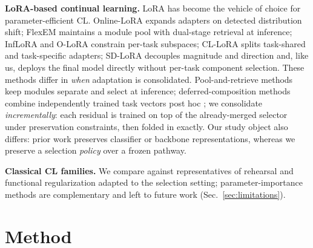 \documentclass{article}
\begin{document}
\textbf{LoRA-based continual learning.} LoRA \cite{hu2022lora} has become the vehicle of choice for parameter-efficient CL. Online-LoRA \cite{wei2025onlinelora} expands adapters on detected distribution shift; FlexEM \cite{chen2026flexem} maintains a module pool with dual-stage retrieval at inference; InfLoRA \cite{liang2024inflora} and O-LoRA \cite{wang2023olora} constrain per-task subspaces; CL-LoRA \cite{he2025cllora} splits task-shared and task-specific adapters; SD-LoRA \cite{wu2025sdlora} decouples magnitude and direction and, like us, deploys the final model directly without per-task component selection. These methods differ in \emph{when} adaptation is consolidated. Pool-and-retrieve methods keep modules separate and select at inference; deferred-composition methods combine independently trained task vectors post hoc \cite{ilharco2023task,yadav2023ties,marczak2024magmax}; we consolidate \emph{incrementally}: each residual is trained on top of the already-merged selector under preservation constraints, then folded in exactly. Our study object also differs: prior work preserves classifier or backbone representations, whereas we preserve a selection \emph{policy} over a frozen pathway.

\textbf{Classical CL families.} We compare against representatives of rehearsal \cite{lopezpaz2017gem,buzzega2020derpp,rebuffi2017icarl} and functional regularization \cite{li2018lwf} adapted to the selection setting; parameter-importance methods \cite{kirkpatrick2017ewc} are complementary and left to future work (Sec.~\ref{sec:limitations}).

\section{Method}
\label{sec:method}
\end{document}
